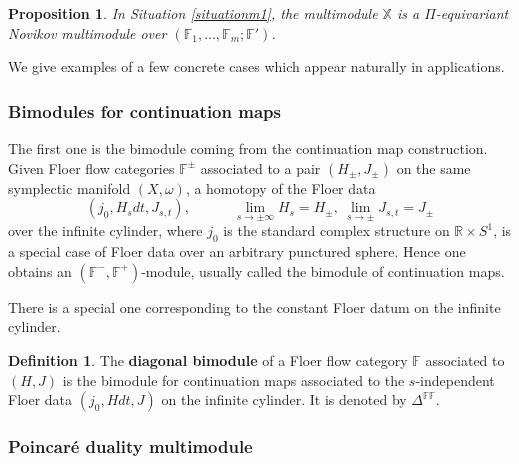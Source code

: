 \documentclass[reqno, 10pt]{amsart}
\numberwithin{equation}{section}
\numberwithin{equation}{section}
\newtheorem{prop}[thm]{Proposition}
\theoremstyle{definition}
\newtheorem{defn}[thm]{Definition}
\theoremstyle{remark}
\newcommand{\beqn}{\begin{equation*}}
\newcommand{\eeqn}{\end{equation*}}
\newcommand{\mb}{\mathbb}
\begin{document}
\begin{prop}
In Situation \ref{situationm1}, the multimodule ${\mb X}$ is a $\Pi$-equivariant Novikov multimodule over $({\mb F}_1, \ldots, {\mb F}_m; {\mb F}')$.
\end{prop}



We give examples of a few concrete cases which appear naturally in applications.

\subsubsection{Bimodules for continuation maps} The first one is the bimodule coming from the continuation map construction. Given Floer flow categories $\mb{F}^\pm$ associated to a pair $(H_\pm, J_\pm)$ on the same symplectic manifold $(X, \omega)$, a homotopy of the Floer data
\beqn
(j_0, H_s dt, J_{s, t}), \quad \quad \quad \lim_{s \to \pm \infty} H_s = H_\pm,\ \lim_{s \to \pm} J_{s, t} = J_\pm
\eeqn
over the infinite cylinder, where $j_0$ is the standard complex structure on $\mb{R} \times S^1$, is a special case of Floer data over an arbitrary punctured sphere. Hence one obtains an $({\mb F}^-, {\mb F}^+)$-module, usually called the bimodule of continuation maps. 

There is a special one corresponding to the constant Floer datum on the infinite cylinder. 

\begin{defn}\label{defn_diagonal_bimodule}
The {\bf diagonal bimodule} of a Floer flow category $\mb{F}$ associated to $(H, J)$ is the bimodule for continuation maps associated to the $s$-independent Floer data $(j_0, Hdt, J)$ on the infinite cylinder. It is denoted by $\mb{\Delta}^{\mb{FF}}$.
\end{defn}



\subsubsection{Poincar\'e duality multimodule}
\end{document}
